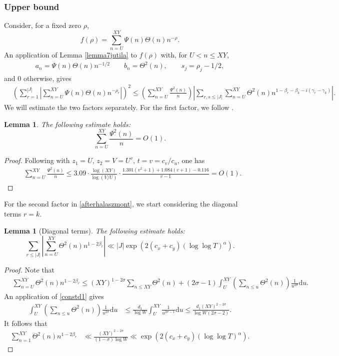 \documentclass[reqno]{amsart}
\newtheorem{lemma}[theorem]{Lemma}
\numberwithin{equation}{section}
\theoremstyle{remark}
\begin{document}
\subsubsection{Upper bound} Consider, for a fixed zero $\rho$,
\[
f(\rho)=\sum_{n=U}^{XY}\Psi(n)\Theta(n) n^{-\rho}.
\]
An application of Lemma \ref{lemma7jutila} to $f(\rho)$ with, for $U<n\le XY$,
\begin{align*}
a_n  =\Psi(n) \Theta(n) n^{-1 / 2} \qquad b_n =\Theta^2(n), \qquad s_j=\rho_j-1 / 2,
\end{align*}
and $0$ otherwise, gives
\begin{equation}\label{afterhalaszmont}
 \begin{aligned}
    &   \left(\sum_{r=1}^{|J|}\left|\sum_{n=U}^{XY}\Psi(n)\Theta(n) n^{-\rho_r}\right|\right)^2\le \left(\sum_{n=U}^{XY}\frac{\Psi^2(n)}{n}\right)\left|\sum_{r,s\le |J|}\sum_{n=U}^{XY}\Theta^2(n)n^{1-\beta_r-\beta_k-i(\gamma_r-\gamma_k)}\right|.
\end{aligned}
\end{equation}
We will estimate the two factors separately. For the first factor, we follow \cite{BELLOTTIlogfree}.
\begin{lemma}\label{an2bn}
   The following estimate holds:
    \[
     \sum_{n=U}^{XY}\frac{\Psi^2(n)}{n}=O(1).
    \] 
\end{lemma}
\begin{proof}
  Following \cite{BELLOTTIlogfree} with $z_1=U$, $z_2=V=U^v$, $t=v=c_v/c_u$, one has
    \begin{equation*}
        \begin{aligned}
          &\sum_{n=U}^{XY}\frac{\Psi^2(n)}{n}\le3.09\cdot \frac{\log (XY)}{\log(V/U)}\cdot \frac{1.301(v^2+1)+1.084(v+1)-0.116}{v-1}=O(1).
        \end{aligned}
    \end{equation*}
\end{proof}
For the second factor in \eqref{afterhalaszmont}, we start considering the diagonal terms $r=k$.
\begin{lemma}[Diagonal terms]\label{lem:diagonal}
  The following estimate holds:
 \[\sum_{r\le |J|}\left|\sum_{n=U}^{XY}\Theta^2(n)n^{1-2\beta_r}\right|\ll |J|\exp(2(c_x+c_y)(\log\log T)^{\alpha}). \]
\end{lemma}
\begin{proof}Note that
\begin{align*}
    &\sum_{n=U}^{XY}\Theta^2(n)n^{1-2\beta_r}\le (XY)^{1-2\sigma}\sum_{n\le XY}\Theta^2(n)+(2\sigma-1)\int_{U}^{XY}\left(\sum_{n\le u}\Theta^2(n)\right)\frac{1}{u^{2\sigma}}\text{d}u.
\end{align*}
An application of \eqref{constd1} gives
\begin{align*}
   \int_{U}^{XY}\left(\sum_{n\le u}\Theta^2(n)\right)\frac{1}{u^{2\sigma}}\text{d}u&\le \frac{d_1}{\log W}\int_{U}^{XY}\frac{1}{u^{2\sigma-1}}\text{d}u\le  \frac{d_1(XY)^{2-2\sigma}}{\log W(2\sigma-2)}.
\end{align*}
It follows that
\begin{align*}
    \sum_{n=1}^{XY}\Theta^2(n)n^{1-2\beta_r}&\ll\frac{(XY)^{2-2\sigma}}{(1-\sigma)\log W}\ll  \exp(2(c_x+c_y)(\log\log T)^{\alpha}).
\end{align*}
\end{proof}
\end{document}
